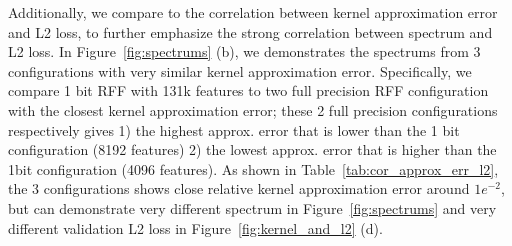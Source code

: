 Additionally, we compare to the correlation between kernel approximation error and L2 loss, to further emphasize the strong correlation between spectrum and L2 loss. In Figure~\ref{fig:spectrums} (b), we demonstrates the spectrums from 3 configurations with very similar kernel approximation error. Specifically, we compare 1 bit RFF with 131k features to two full precision RFF configuration with the closest kernel approximation error; these 2 full precision configurations respectively gives 1) the highest approx. error that is lower than the 1 bit configuration (8192 features) 2) the lowest approx. error that is higher than the 1bit configuration (4096 features). As shown in Table~\ref{tab:cor_approx_err_l2}, the 3 configurations shows close relative kernel approximation error around $1e^{-2}$, but can demonstrate very different spectrum in Figure~\ref{fig:spectrums} and very different validation L2 loss in Figure~\ref{fig:kernel_and_l2} (d).

